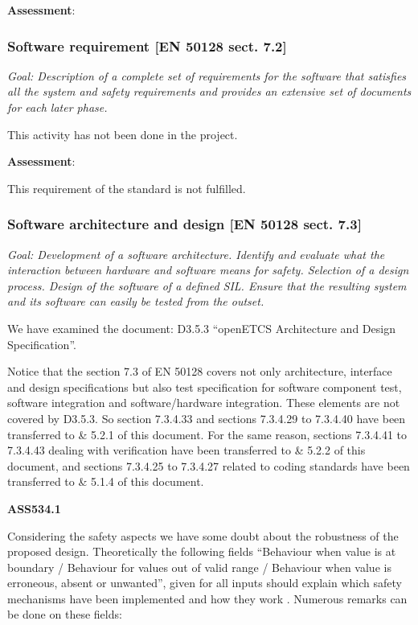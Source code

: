 \bigskip

\textbf{Assessment}:

\bigskip

\subsubsection{Software requirement [EN 50128 sect. 7.2]}
\textit{Goal: Description of a complete set of requirements for the software that satisfies all the system and safety requirements and provides an extensive set of documents for each later phase.}

\bigskip
This activity has not been done in the project.

\bigskip

\textbf{Assessment}:

\bigskip
This requirement of the standard is not fulfilled.
\bigskip

\subsubsection{Software architecture and design [EN 50128 sect. 7.3]} 
\textit{Goal: Development of a software architecture. Identify and evaluate what the interaction between hardware and software means for safety. Selection of a design process. Design of the software of a defined SIL. Ensure that the resulting system and its software can easily be tested from the outset.}

We have examined the document: D3.5.3 ``openETCS Architecture and Design Specification''.

Notice that the section 7.3 of EN 50128 covers not only architecture, interface and design specifications but also test
specification for software component test, software integration and software/hardware integration. These elements are
not covered by D3.5.3. So section 7.3.4.33 and sections 7.3.4.29 to 7.3.4.40 have been transferred to \& 5.2.1 of this
document. For the same reason, sections 7.3.4.41 to 7.3.4.43 dealing with verification have been transferred to \& 5.2.2
of this document, and sections 7.3.4.25 to 7.3.4.27 related to coding standards have been transferred to \& 5.1.4 of
this document.

{\bfseries ASS534.1}

Considering the safety aspects we have some doubt about the robustness of the proposed design. Theoretically the
following fields ``Behaviour when value is at boundary / Behaviour for values out of valid range / Behaviour when value
is erroneous, absent or unwanted'', given for all inputs should explain which safety mechanisms have been implemented
and how they work . Numerous remarks can be done on these fields:

